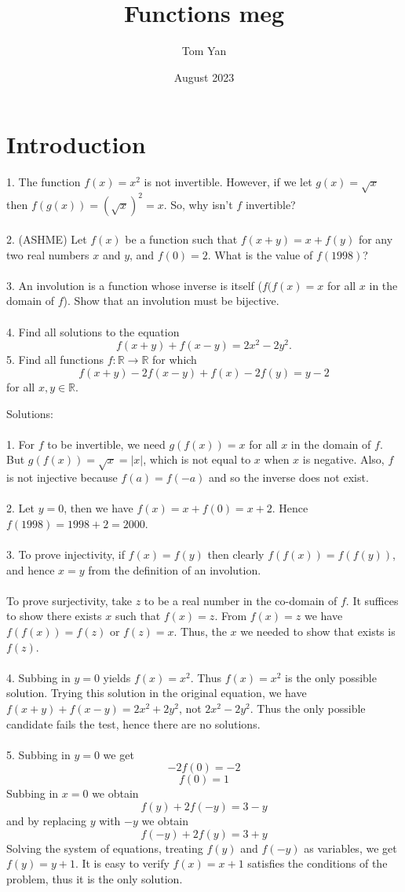 \documentclass{article}
\title{Functions meg}
\author{Tom Yan}
\date{August 2023}
\begin{document}
\maketitle

\section{Introduction}
1. The function $f(x)=x^2$ is not invertible. However, if we let $g(x)=\sqrt{x}$ then $f(g(x))=(\sqrt{x})^2=x$. So, why isn't $f$ invertible?   \\\\
2. (ASHME) Let $f(x)$ be a function such that $f(x+y)=x+f(y)$ for any two real numbers $x$ and $y$, and $f(0)=2$. What is the value of $f(1998)$?\\\\
3. An involution is a function whose inverse is itself ($f(f(x)=x$ for all $x$ in the domain of $f$). Show that an  involution must be bijective. \\\\
4. Find all solutions to the equation $$f(x+y)+f(x-y)=2x^2-2y^2.$$ 
5. Find all functions $f: \mathbb{R} \rightarrow \mathbb{R} $ for which $$f(x+y)-2f(x-y)+f(x)-2f(y)=y-2$$ for all $x,y \in \mathbb{R}$. 

\newpage 
Solutions: \\\\
1. For $f$ to be invertible, we need $g(f(x))=x$ for all $x$ in the domain of $f$. But $g(f(x))=\sqrt{x}=|x|$, which is not equal to $x$ when $x$ is negative. Also, $f$ is not injective because $f(a)=f(-a)$ and so the inverse does not exist. \\\\
2. Let $y=0$, then we have $f(x)=x+f(0)=x+2$. Hence $f(1998)=1998+2=2000$. \\\\
3. To prove injectivity, if $f(x)=f(y)$ then clearly $f(f(x))=f(f(y))$, and hence $x=y$ from the definition of an involution. \\\\ To prove surjectivity, take $z$ to be a real number in the co-domain of $f$. It suffices to show there exists $x$ such that $f(x)=z$. From $f(x)=z$ we have $f(f(x))=f(z)$ or $f(z)=x$. Thus, the $x$ we needed to show that exists is $f(z)$. \\\\
4. Subbing in $y=0$ yields $f(x)=x^2$. Thus $f(x)=x^2$ is the only possible solution. Trying this solution in the original equation, we have $f(x+y)+f(x-y)=2x^2+2y^2$, not $2x^2-2y^2$. Thus the only possible candidate fails the test, hence there are no solutions. \\\\
5. Subbing in $y=0$ we get $$-2f(0)=-2$$ $$f(0)=1$$ Subbing in $x=0$ we obtain $$f(y)+2f(-y)=3-y$$ and by replacing $y$ with $-y$ we obtain $$f(-y)+2f(y)=3+y$$ Solving the system of equations, treating $f(y)$ and $f(-y)$ as variables, we get $f(y)=y+1$. It is easy to verify $f(x)=x+1$ satisfies the conditions of the problem, thus it is the only solution. 
\end{document}
